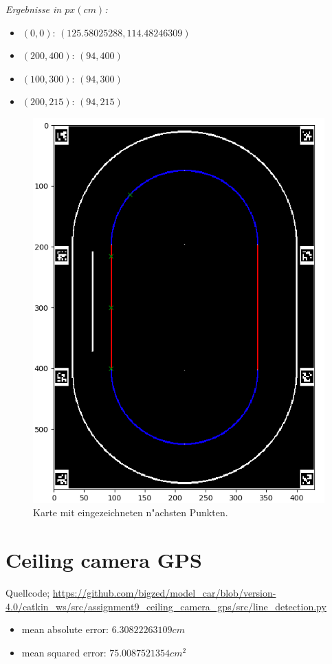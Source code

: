 \documentclass[10pt,oneside,a4paper]{article}
\begin{document}
    \emph{Ergebnisse in \( px(cm) \):}
    \begin{itemize}
      \item{\((0,0)\)}: \( (125.58025288, 114.48246309) \)
      \item{\((200,400)\)}: \( (94, 400) \)
      \item{\((100,300)\)}: \( (94, 300) \)
      \item{\((200,215)\)}: \( (94, 215) \)
    \end{itemize}
    \begin{figure}[h]
      \centering
      \includegraphics[scale=0.5]{pictures/closest_point_graph.png}
      \caption{Karte mit eingezeichneten n"achsten Punkten.}
    \end{figure}
    \newpage

  \section{Ceiling camera GPS}
    Quellcode; \url{https://github.com/bigzed/model_car/blob/version-4.0/catkin_ws/src/assignment9_ceiling_camera_gps/src/line_detection.py}
    \begin{itemize}
      \item mean absolute error: \( 6.30822263109cm \)
      \item mean squared error: \( 75.0087521354cm^{2} \)
    \end{itemize}
\end{document}
